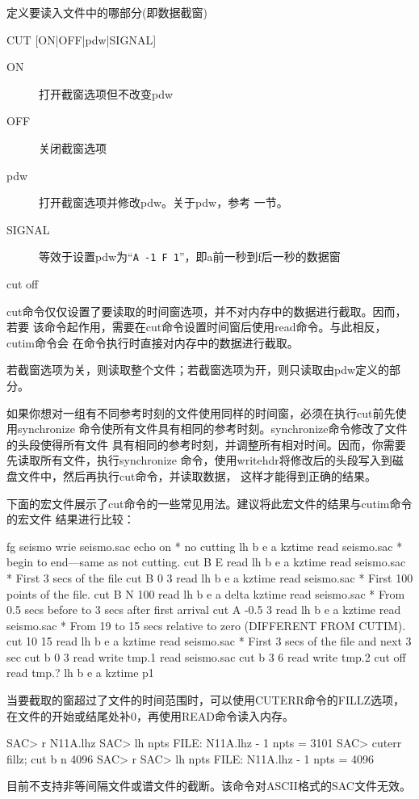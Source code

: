 \label{cmd:cut}

定义要读入文件中的哪部分(即数据截窗)

\begin{SACSTX}
CUT [ON|OFF|pdw|SIGNAL]
\end{SACSTX}

\begin{description}
\item [ON] 打开截窗选项但不改变pdw
\item [OFF] 关闭截窗选项
\item [pdw] 打开截窗选项并修改pdw。关于pdw，参考  一节。
\item [SIGNAL] 等效于设置pdw为``\texttt{A -1 F 1}''，即a前一秒到f后一秒的数据窗
\end{description}

\begin{SACDFT}
cut off
\end{SACDFT}

cut命令仅仅设置了要读取的时间窗选项，并不对内存中的数据进行截取。因而，若要
该命令起作用，需要在cut命令设置时间窗后使用read命令。与此相反，cutim命令会
在命令执行时直接对内存中的数据进行截取。

若截窗选项为关，则读取整个文件；若截窗选项为开，则只读取由pdw定义的部分。

如果你想对一组有不同参考时刻的文件使用同样的时间窗，必须在执行cut前先使用synchronize
命令使所有文件具有相同的参考时刻。synchronize命令修改了文件的头段使得所有文件
具有相同的参考时刻，并调整所有相对时间。因而，你需要先读取所有文件，执行synchronize
命令，使用writehdr将修改后的头段写入到磁盘文件中，然后再执行cut命令，并读取数据，
这样才能得到正确的结果。

下面的宏文件展示了cut命令的一些常见用法。建议将此宏文件的结果与cutim命令的宏文件
结果进行比较：
\begin{SACCode}
fg seismo
wrie seismo.sac
echo on
* no cutting
lh b e a kztime
read seismo.sac
* begin to end---same as not cutting.
cut B E
read
lh b e a kztime
read seismo.sac
* First 3 secs of the file
cut B 0 3
read
lh b e a kztime
read seismo.sac
* First 100 points of the file.
cut B N 100
read
lh b e a delta kztime
read seismo.sac
* From 0.5 secs before to 3 secs after first arrival
cut A -0.5 3
read
lh b e a kztime
read seismo.sac
* From 19 to 15 secs relative to zero (DIFFERENT FROM CUTIM).
cut 10 15
read
lh b e a kztime
read seismo.sac
* First 3 secs of the file and next 3 sec
cut b 0 3
read
write tmp.1
read seismo.sac
cut b 3 6
read
write tmp.2
cut off
read tmp.?
lh b e a kztime
p1
\end{SACCode}

当要截取的窗超过了文件的时间范围时，可以使用CUTERR命令的FILLZ选项，
在文件的开始或结尾处补0，再使用READ命令读入内存。
\begin{SACCode}
SAC> r N11A.lhz
SAC> lh npts
FILE: N11A.lhz - 1
npts = 3101
SAC> cuterr fillz; cut b n 4096
SAC> r
SAC> lh npts
FILE: N11A.lhz - 1
npts = 4096
\end{SACCode}

目前不支持非等间隔文件或谱文件的截断。该命令对ASCII格式的SAC文件无效。
